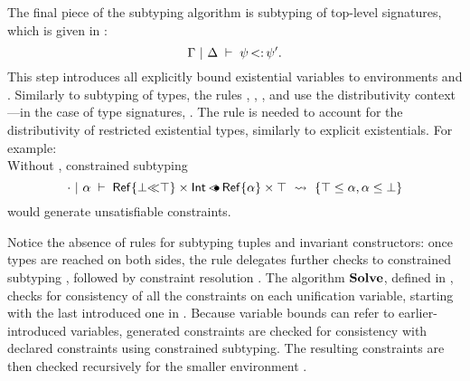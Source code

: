 The final piece of the subtyping algorithm is subtyping of top-level signatures,
which is given in :
\[
    \Gamma~\vert~\Delta\;\vdash\;\psi \operatorname{<:} \psi'.
\]
This step introduces all explicitly bound existential variables to
environments \AEnv and \UEnv.
Similarly to subtyping of types, the rules , ,
, and  use the distributivity context---in
the case of type signatures, \dctxsig.
The rule  is needed to account for the distributivity of restricted
existential types, similarly to explicit existentials. For example:\\
Without , constrained subtyping
\[
    \cdot~\vert~\alpha\;\vdash\;\mathsf{Ref}\{\bot{\operatorname{\ll}}\top\} \times \mathsf{Int} \operatorname{\lessdot\!\!\bullet} \mathsf{Ref}\{\alpha\} \times \top\ \rightsquigarrow\  \{\top \leq \alpha, \alpha \leq \bot\} 
\]
would generate unsatisfiable constraints.

Notice the absence of rules for subtyping tuples and invariant constructors:
once types are reached on both sides, the rule  delegates further
checks to constrained subtyping ,
followed by constraint resolution \solvectrdflt.
The algorithm $\operatorname{\mathbf{Solve}}$, defined in , 
checks for consistency of all the constraints on each
unification variable, starting with the last introduced one in \UEnv.
Because variable bounds can refer to earlier-introduced variables,
generated constraints are checked for consistency with declared constraints
using constrained subtyping. The resulting constraints are then checked
recursively for the smaller environment \UEnv.

